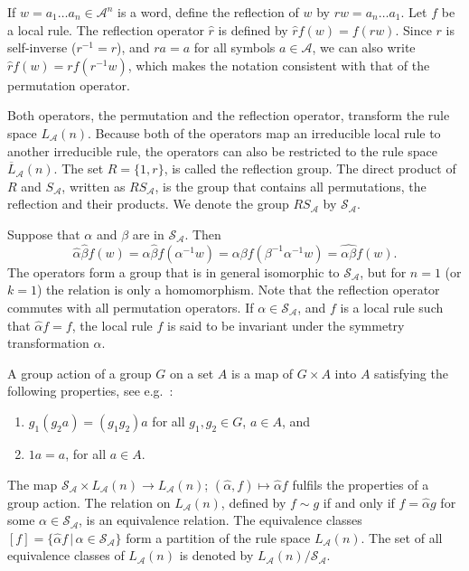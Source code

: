 \documentclass[a4paper]{article}
\begin{document}
If $w = a_1\ldots a_{n} \in \mathcal{A}^n$ is a word,
define the reflection of $w$ by $rw  = a_{n} \ldots a_1$.
Let $f$ be a local rule.
The reflection operator $\hat{r}$ is defined by $\hat{r} f(w) = f(rw)$.
Since $r$ is self-inverse ($r^{-1} = r$),
and $ra = a$ for all symbols $a \in \mathcal{A}$, we can also write $\hat{r} f(w) = rf(r^{-1}w)$,
which makes the notation consistent with that of the permutation operator.

Both operators, the permutation and the reflection operator, transform the rule
space $L_\mathcal{A}(n)$.
Because both of the operators map an irreducible local rule to another irreducible rule,
the operators can also be restricted to the rule space $\overline{L}_\mathcal{A}(n)$.
The set $R = \{1, r\}$, is called the reflection group.
The direct product of $R$ and $S_\mathcal{A}$, written as $RS_\mathcal{A}$, is the group that contains all permutations,
the reflection and their products.
We denote the group $RS_\mathcal{A}$ by  $\mathcal{S}_\mathcal{A}$.

Suppose that $\alpha$ and $\beta$ are in $\mathcal{S}_\mathcal{A}$.
Then
\[
\hat{\alpha} \hat{\beta} f (w)  = \alpha \hat{\beta} f(\alpha^{-1} w)
= \alpha \beta f( \beta^{-1} \alpha^{-1} w) = \widehat{\alpha \beta} f(w).
\]
The operators form a group that is in general isomorphic to $\mathcal{S}_\mathcal{A}$,
but for $n=1$ (or $k=1$) the relation is only a homomorphism.
Note that the reflection operator commutes with all permutation operators.
If $\alpha \in \mathcal{S}_\mathcal{A}$, and $f$ is a local rule such that $\hat{\alpha} f = f$,
the local rule $f$ is said to be invariant under the symmetry transformation $\alpha$.

A group action of a group $G$ on a set $A$ is a map of $G \times A$ into $A$
satisfying the following properties, see e.g.~\cite{rotman2012introduction}:
\begin{enumerate}[label=(\roman*)]
\item $g_1(g_2a) = (g_1g_2)a$ for all $g_1,g_2 \in G$, $a \in A$, and
\item $1a=a$, for all $a \in A$.
\end{enumerate}

The map $\mathcal{S}_\mathcal{A} \times L_\mathcal{A}(n) \to L_\mathcal{A}(n)$; $(\hat{\alpha}, f) \mapsto \hat{\alpha} f$
fulfils the properties of a group action.
The relation on $L_\mathcal{A}(n)$, defined by $f \sim g$ if and only if $f = \hat{\alpha} g$ for some
$\alpha \in \mathcal{S}_\mathcal{A}$, is an equivalence relation.
The equivalence classes $[f] = \{ \hat{\alpha}f \, | \, \alpha \in \mathcal{S}_\mathcal{A} \}$ form a partition
of the rule space $L_\mathcal{A}(n)$.
The set of all equivalence classes of $L_\mathcal{A}(n)$ is denoted by $L_\mathcal{A}(n) / \mathcal{S}_\mathcal{A}$.
\end{document}
